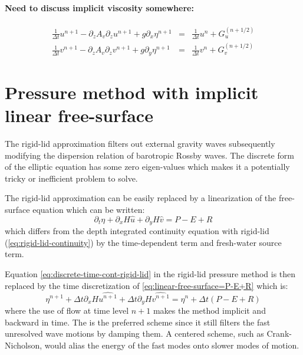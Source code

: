 \paragraph{Need to discuss implicit viscosity somewhere:}
\begin{eqnarray}
\frac{1}{\Delta t} u^{n+1} - \partial_z A_v \partial_z u^{n+1}
+ g \partial_x \eta^{n+1} & = & \frac{1}{\Delta t} u^{n} +
G_u^{(n+1/2)}
\\
\frac{1}{\Delta t} v^{n+1} - \partial_z A_v \partial_z v^{n+1}
+ g \partial_y \eta^{n+1} & = & \frac{1}{\Delta t} v^{n} + G_v^{(n+1/2)}
\end{eqnarray}


\section{Pressure method with implicit linear free-surface}
\label{sect:pressure-method-linear-backward}

The rigid-lid approximation filters out external gravity waves
subsequently modifying the dispersion relation of barotropic Rossby
waves. The discrete form of the elliptic equation has some zero
eigen-values which makes it a potentially tricky or inefficient
problem to solve.

The rigid-lid approximation can be easily replaced by a linearization
of the free-surface equation which can be written:
\begin{equation}
\partial_t \eta + \partial_x H \widehat{u} + \partial_y H \widehat{v} = P-E+R
\label{eq:linear-free-surface=P-E+R}
\end{equation}
which differs from the depth integrated continuity equation with
rigid-lid (\ref{eq:rigid-lid-continuity}) by the time-dependent term
and fresh-water source term.

Equation \ref{eq:discrete-time-cont-rigid-lid} in the rigid-lid
pressure method is then replaced by the time discretization of
\ref{eq:linear-free-surface=P-E+R} which is:
\begin{equation}
\eta^{n+1}
+ \Delta t \partial_x H \widehat{u^{n+1}}
+ \Delta t \partial_y H \widehat{v^{n+1}}
=
\eta^{n}
+ \Delta t ( P - E + R )
\label{eq:discrete-time-backward-free-surface}
\end{equation}
where the use of flow at time level $n+1$ makes the method implicit
and backward in time. The is the preferred scheme since it still
filters the fast unresolved wave motions by damping them. A centered
scheme, such as Crank-Nicholson, would alias the energy of the fast
modes onto slower modes of motion.

